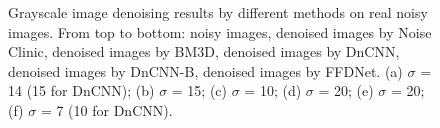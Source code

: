 \documentclass[journal]{IEEEtran}
\begin{document}
\begin{figure}[!htbp]
\begin{center}
\caption{Grayscale image denoising results by different methods on real noisy images. From top to bottom: noisy images, denoised images by Noise Clinic, denoised images by BM3D, denoised images by DnCNN, denoised images by DnCNN-B, denoised images by FFDNet. (a) $\sigma$ = 14 (15 for DnCNN); (b) $\sigma$ = 15; (c) $\sigma$ = 10; (d) $\sigma$ = 20; (e) $\sigma$ = 20; (f) $\sigma$ = 7 (10 for DnCNN).}\label{fig_rn1}
\end{center}
\end{figure}
\end{document}
